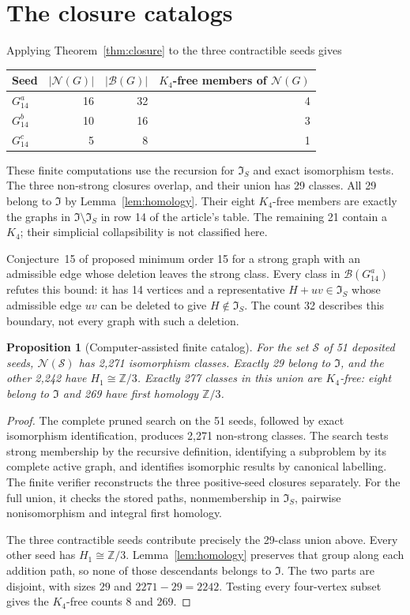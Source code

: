 \documentclass[11pt]{amsart}
\newcommand{\I}{\mathfrak I}
\newcommand{\IS}{\mathfrak I_S}
\newcommand{\ZZ}{\mathbb Z}
\newcommand{\Ga}{G_{14}^{a}}
\newcommand{\Gb}{G_{14}^{b}}
\newcommand{\Gc}{G_{14}^{c}}
\newcommand{\NS}{\mathcal N}
\newcommand{\BS}{\mathcal B}
\newtheorem{proposition}[theorem]{Proposition}
\theoremstyle{definition}
\begin{document}
\section{The closure catalogs}\label{sec:catalogs}
Applying Theorem~\ref{thm:closure} to the three contractible seeds gives
\begin{center}
\begin{tabular}{lrrr}
\toprule
Seed & $|\NS(G)|$ & $|\BS(G)|$ & $K_4$-free members of $\NS(G)$\\
\midrule
$\Ga$ &16&32&4\\
$\Gb$ &10&16&3\\
$\Gc$ &5&8&1\\
\bottomrule
\end{tabular}
\end{center}
These finite computations use the recursion for $\IS$ and exact
isomorphism tests. The three non-strong closures overlap, and their
union has 29 classes.
All 29 belong to $\I$ by Lemma~\ref{lem:homology}.
Their eight $K_4$-free members are exactly the graphs in
$\I\setminus\IS$ in row 14 of the article's table. The remaining 21 contain a $K_4$;
their simplicial collapsibility is not classified here.

Conjecture~15 of \cite{DEFH2023} proposed minimum order 15 for a strong
graph with an admissible edge whose deletion leaves the strong class.
Every class in $\BS(\Ga)$ refutes this bound: it has 14 vertices and
a representative $H+uv\in\IS$ whose admissible edge $uv$ can be deleted
to give $H\notin\IS$.
The count 32 describes this boundary, not every graph with such a
deletion.

\begin{proposition}[Computer-assisted finite catalog]\label{prop:2271}
For the set $\mathcal S$ of 51 deposited seeds,
$\NS(\mathcal S)$ has 2,271 isomorphism classes. Exactly 29 belong
to $\I$, and the other 2,242 have $H_1\cong\ZZ/3$.
Exactly 277 classes in this union are $K_4$-free: eight belong to
$\I$ and 269 have first homology $\ZZ/3$.
\end{proposition}
\begin{proof}
The complete pruned search on the 51 seeds, followed by exact
isomorphism identification, produces 2,271 non-strong classes.
The search tests strong membership by the recursive definition,
identifying a subproblem by its complete active graph, and identifies
isomorphic results by canonical labelling.
The finite verifier reconstructs the three positive-seed closures
separately. For the full union, it checks the stored paths,
nonmembership in $\IS$, pairwise nonisomorphism and integral first
homology.

The three contractible seeds contribute precisely the 29-class union
above. Every other seed has $H_1\cong\ZZ/3$.
Lemma~\ref{lem:homology} preserves that group along each addition path,
so none of those descendants belongs to $\I$.
The two parts are disjoint, with sizes $29$ and $2271-29=2242$.
Testing every four-vertex subset gives the $K_4$-free counts 8 and 269.
\end{proof}
\end{document}
